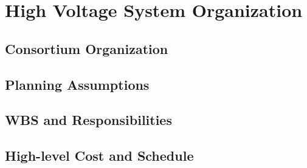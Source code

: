 




\section{High Voltage System Organization}
\label{sec:fdsp-hv-org}

\subsection{Consortium Organization}
\label{sec:fdsp-hv-org-consortium}


\subsection{Planning Assumptions}
\label{sec:fdsp-hv-org-assmp}


\subsection{WBS and Responsibilities}
\label{sec:fdsp-hv-org-wbs}

\subsection{High-level Cost and Schedule}
\label{sec:fdsp-hv-org-cs}














